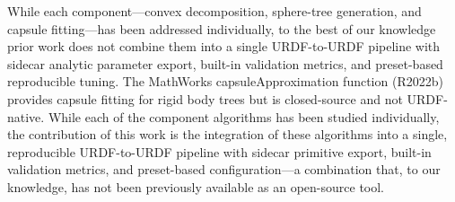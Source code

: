 While each component---convex decomposition, sphere-tree generation, and capsule fitting---has been addressed individually, to the best of our knowledge prior work does not combine them into a single URDF-to-URDF pipeline with sidecar analytic parameter export, built-in validation metrics, and preset-based reproducible tuning. The MathWorks capsuleApproximation function (R2022b) provides capsule fitting for rigid body trees but is closed-source and not URDF-native. While each of the component algorithms has been studied individually, the contribution of this work is the integration of these algorithms into a single, reproducible URDF-to-URDF pipeline with sidecar primitive export, built-in validation metrics, and preset-based configuration---a combination that, to our knowledge, has not been previously available as an open-source tool.
